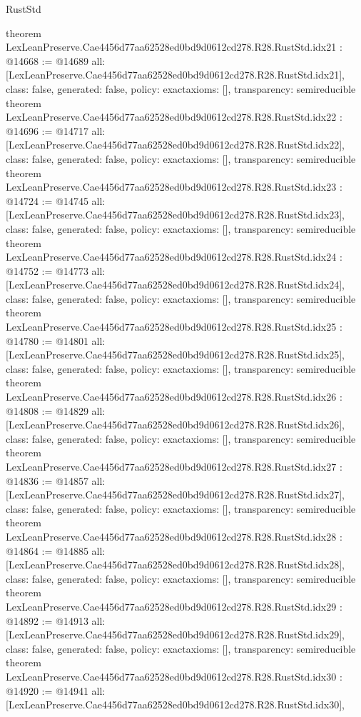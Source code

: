 \begin{lexlean}{RustStd}
\begin{coremodule}
{}
theorem LexLeanPreserve.Cae4456d77aa62528ed0bd9d0612cd278.R28.RustStd.idx21 : @14668 := @14689 {
  all: [LexLeanPreserve.Cae4456d77aa62528ed0bd9d0612cd278.R28.RustStd.idx21],
  class: false,
  generated: false,
  policy: exact{axioms: []},
  transparency: semireducible
}
theorem LexLeanPreserve.Cae4456d77aa62528ed0bd9d0612cd278.R28.RustStd.idx22 : @14696 := @14717 {
  all: [LexLeanPreserve.Cae4456d77aa62528ed0bd9d0612cd278.R28.RustStd.idx22],
  class: false,
  generated: false,
  policy: exact{axioms: []},
  transparency: semireducible
}
theorem LexLeanPreserve.Cae4456d77aa62528ed0bd9d0612cd278.R28.RustStd.idx23 : @14724 := @14745 {
  all: [LexLeanPreserve.Cae4456d77aa62528ed0bd9d0612cd278.R28.RustStd.idx23],
  class: false,
  generated: false,
  policy: exact{axioms: []},
  transparency: semireducible
}
theorem LexLeanPreserve.Cae4456d77aa62528ed0bd9d0612cd278.R28.RustStd.idx24 : @14752 := @14773 {
  all: [LexLeanPreserve.Cae4456d77aa62528ed0bd9d0612cd278.R28.RustStd.idx24],
  class: false,
  generated: false,
  policy: exact{axioms: []},
  transparency: semireducible
}
theorem LexLeanPreserve.Cae4456d77aa62528ed0bd9d0612cd278.R28.RustStd.idx25 : @14780 := @14801 {
  all: [LexLeanPreserve.Cae4456d77aa62528ed0bd9d0612cd278.R28.RustStd.idx25],
  class: false,
  generated: false,
  policy: exact{axioms: []},
  transparency: semireducible
}
theorem LexLeanPreserve.Cae4456d77aa62528ed0bd9d0612cd278.R28.RustStd.idx26 : @14808 := @14829 {
  all: [LexLeanPreserve.Cae4456d77aa62528ed0bd9d0612cd278.R28.RustStd.idx26],
  class: false,
  generated: false,
  policy: exact{axioms: []},
  transparency: semireducible
}
theorem LexLeanPreserve.Cae4456d77aa62528ed0bd9d0612cd278.R28.RustStd.idx27 : @14836 := @14857 {
  all: [LexLeanPreserve.Cae4456d77aa62528ed0bd9d0612cd278.R28.RustStd.idx27],
  class: false,
  generated: false,
  policy: exact{axioms: []},
  transparency: semireducible
}
theorem LexLeanPreserve.Cae4456d77aa62528ed0bd9d0612cd278.R28.RustStd.idx28 : @14864 := @14885 {
  all: [LexLeanPreserve.Cae4456d77aa62528ed0bd9d0612cd278.R28.RustStd.idx28],
  class: false,
  generated: false,
  policy: exact{axioms: []},
  transparency: semireducible
}
theorem LexLeanPreserve.Cae4456d77aa62528ed0bd9d0612cd278.R28.RustStd.idx29 : @14892 := @14913 {
  all: [LexLeanPreserve.Cae4456d77aa62528ed0bd9d0612cd278.R28.RustStd.idx29],
  class: false,
  generated: false,
  policy: exact{axioms: []},
  transparency: semireducible
}
theorem LexLeanPreserve.Cae4456d77aa62528ed0bd9d0612cd278.R28.RustStd.idx30 : @14920 := @14941 {
  all: [LexLeanPreserve.Cae4456d77aa62528ed0bd9d0612cd278.R28.RustStd.idx30],
}
\end{coremodule}
\end{lexlean}
